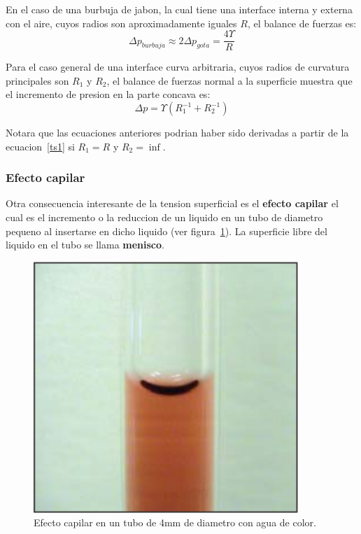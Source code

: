 \documentclass[10pt, oneside]{article}
\begin{document}
En el caso de una burbuja de jabon, la cual tiene una interface interna y externa con el aire, cuyos radios son aproximadamente iguales $R$, el balance de fuerzas es:
\begin{equation}
\Delta p_{burbuja} \approx 2 \Delta p_{gota} = \frac{4\Upsilon}{R}
\end{equation}

Para el caso general de una interface curva arbitraria, cuyos radios de curvatura principales son $R_1$ y $R_2$, el balance de fuerzas normal a la superficie  muestra que el incremento de presion en la parte concava es:
\begin{equation}
\Delta p = \Upsilon (R^{-1}_1 + R^{-1}_2)
\label{ts1}
\end{equation}

Notara que las ecuaciones anteriores podrian haber sido derivadas a partir de la ecuacion~\ref{ts1} si $R_1 = R$ y $R_2 = \inf$.


\subsubsection{Efecto capilar}
Otra consecuencia interesante de la tension superficial es el \textbf{efecto capilar} el cual es el incremento o la reduccion de un liquido en un tubo de diametro pequeno al insertarse en dicho liquido (ver figura~\ref{efc}). La superficie libre del liquido en el tubo se llama \textbf{menisco}. 

\begin{figure}[h]
\centering
\includegraphics[width=10cm]{ecapilar}
\caption{Efecto capilar en un tubo de 4mm de diametro con agua de color.}
\label{efc}
\end{figure}
\end{document}
